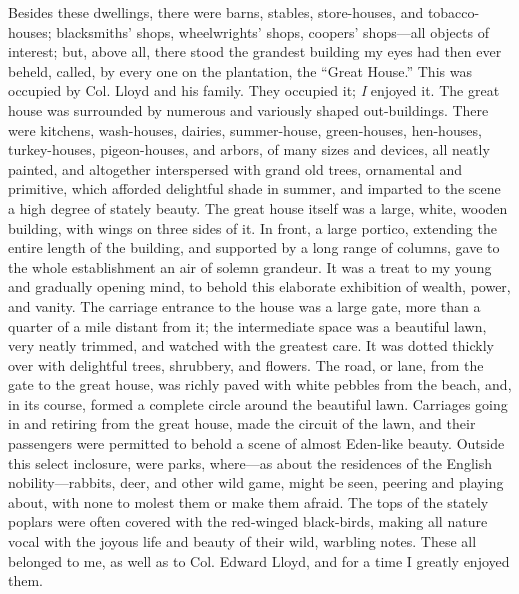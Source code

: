 Besides these dwellings, there were barns, stables, store-houses, and
tobacco-houses; blacksmiths' shops, wheelwrights' shops, coopers'
shops---all objects of interest; but, above all, there stood the
grandest building my eyes had then ever beheld, called, by every one on
the plantation, the ``Great House.'' This was occupied by Col. Lloyd and
his family. They occupied it; \emph{I} enjoyed it. The great house
{\protect\hypertarget{67}{}{}}was surrounded by numerous and variously
shaped out-buildings. There were kitchens, wash-houses, dairies,
summer-house, green-houses, hen-houses, turkey-houses, pigeon-houses,
and arbors, of many sizes and devices, all neatly painted, and
altogether interspersed with grand old trees, ornamental and primitive,
which afforded delightful shade in summer, and imparted to the scene a
high degree of stately beauty. The great house itself was a large,
white, wooden building, with wings on three sides of it. In front, a
large portico, extending the entire length of the building, and
supported by a long range of columns, gave to the whole establishment an
air of solemn grandeur. It was a treat to my young and gradually opening
mind, to behold this elaborate exhibition of wealth, power, and vanity.
The carriage entrance to the house was a large gate, more than a quarter
of a mile distant from it; the intermediate space was a beautiful lawn,
very neatly trimmed, and watched with the greatest care. It was dotted
thickly over with delightful trees, shrubbery, and flowers. The road, or
lane, from the gate to the great house, was richly paved with white
pebbles from the beach, and, in its course, formed a complete circle
around the beautiful lawn. Carriages going in and retiring from the
great house, made the circuit of the lawn, and their passengers were
permitted to behold a scene of almost Eden-like beauty. Outside this
select inclosure, were parks, where---as about the residences of the
English nobility---rabbits, deer, and other wild game, might be seen,
peering and playing about, with none to molest them or make them afraid.
The {\protect\hypertarget{68}{}{}}tops of the stately poplars were often
covered with the red-winged black-birds, making all nature vocal with
the joyous life and beauty of their wild, warbling notes. These all
belonged to me, as well as to Col. Edward Lloyd, and for a time I
greatly enjoyed them.

